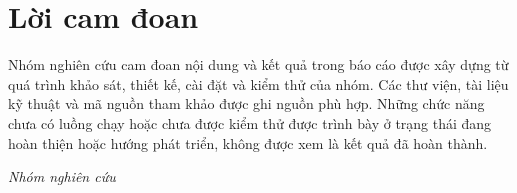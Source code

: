 \chapter*{Lời cam đoan}

Nhóm nghiên cứu cam đoan nội dung và kết quả trong báo cáo được xây dựng từ quá trình khảo sát, thiết kế, cài đặt và kiểm thử của nhóm. Các thư viện, tài liệu kỹ thuật và mã nguồn tham khảo được ghi nguồn phù hợp. Những chức năng chưa có luồng chạy hoặc chưa được kiểm thử được trình bày ở trạng thái đang hoàn thiện hoặc hướng phát triển, không được xem là kết quả đã hoàn thành.

\begin{flushright}
  \textit{Nhóm nghiên cứu}
\end{flushright}
